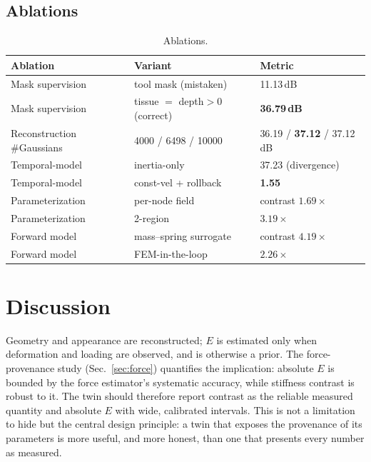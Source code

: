 \documentclass[review]{elsarticle}
\begin{document}
\subsection{Ablations}
\begin{table}[htbp]
\centering
\caption{Ablations.}
\label{tab:ablation}
\small
\begin{tabular}{lll}
\toprule
Ablation & Variant & Metric \\
\midrule
Mask supervision & tool mask (mistaken) & 11.13\,dB \\
Mask supervision & tissue $=$ depth$>$0 (correct) & \textbf{36.79\,dB} \\
Reconstruction \#Gaussians & 4000 / 6498 / 10000 & 36.19 / \textbf{37.12} / 37.12\,dB \\
Temporal-model & inertia-only & 37.23 (divergence) \\
Temporal-model & const-vel + rollback & \textbf{1.55} \\
Parameterization & per-node field & contrast $1.69\times$ \\
Parameterization & 2-region & \textbf{$3.19\times$} \\
Forward model & mass--spring surrogate & contrast $4.19\times$ \\
Forward model & FEM-in-the-loop & \textbf{$2.26\times$} \\
\bottomrule
\end{tabular}
\end{table}

\section{Discussion}
\label{sec:discussion}

Geometry and appearance are reconstructed; $E$ is estimated only when
deformation and loading are observed, and is otherwise a prior. The
force-provenance study (Sec.~\ref{sec:force}) quantifies the implication:
absolute $E$ is bounded by the force estimator's systematic accuracy, while
stiffness contrast is robust to it. The twin should therefore report
contrast as the reliable measured quantity and absolute $E$ with wide,
calibrated intervals. This is not a limitation to hide but the central
design principle: a twin that exposes the provenance of its parameters is
more useful, and more honest, than one that presents every number as
measured.
\end{document}
